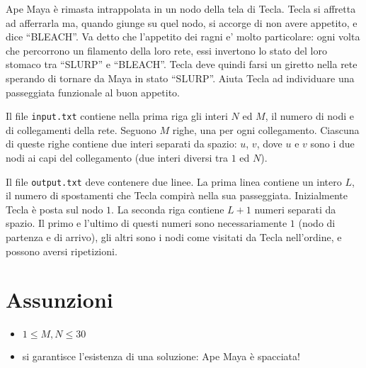 \renewcommand{\nomebreve}{oddcycle}
\renewcommand{\titolo}{Odd Cycle Finding}

\introduzione{}

Ape Maya \`e rimasta intrappolata in un nodo della tela di Tecla.
Tecla si affretta ad afferrarla ma, quando giunge su quel nodo,
si accorge di non avere appetito, e dice ``BLEACH''. Va detto che l'appetito dei ragni e' molto particolare: ogni volta che percorrono un filamento della loro rete,
essi invertono lo stato del loro stomaco tra ``SLURP'' e ``BLEACH''.
Tecla deve quindi farsi un giretto nella rete sperando di tornare da Maya
in stato ``SLURP''. 
Aiuta Tecla ad individuare una passeggiata funzionale al buon appetito.



  
Il file \verb'input.txt' contiene nella prima riga gli interi
$N$ ed $M$, il numero di nodi e di collegamenti della rete.
Seguono $M$ righe, una per ogni collegamento.
Ciascuna di queste righe contiene due interi separati da spazio: $u$, $v$, dove $u$ e $v$ sono i due nodi ai capi del collegamento (due interi diversi tra $1$ ed $N$).

  
Il file \verb'output.txt' deve contenere due linee.
La prima linea contiene un intero $L$,
il numero di spostamenti che Tecla compir\`a nella sua passeggiata.
Inizialmente Tecla \`e posta sul nodo $1$.
La seconda riga contiene $L+1$ numeri separati da spazio.
Il primo e l'ultimo di questi numeri sono necessariamente $1$ (nodo di partenza e di arrivo), gli altri sono i nodi come visitati da Tecla nell'ordine,
e possono aversi ripetizioni.


  \section*{Assunzioni}
  \begin{itemize}  
    \item $ 1 \leq M, N \leq 30$
    \item si garantisce l'esistenza di una soluzione:
          Ape Maya \`e spacciata!
  \end{itemize}



\begin{example}
\end{example}



